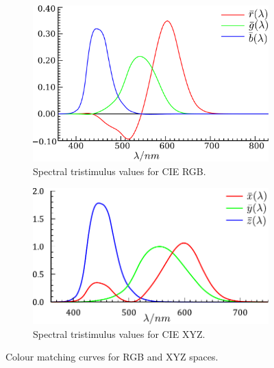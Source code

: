 \begin{figure}[htpb!]
        \centering
        \begin{subfigure}[b]{0.7\textwidth}
                \includegraphics[width=\textwidth]{img/CIE_RGB}
                \caption{Spectral tristimulus values for CIE RGB\footnotemark.}
                \label{fig:cie_rgb}
        \end{subfigure}%
        \quad %
        \begin{subfigure}[b]{0.7\textwidth}
                \includegraphics[width=\textwidth]{img/CIE_XYZ}
                \caption{Spectral tristimulus values for CIE XYZ\footnotemark.}
                \label{fig:cie_xyz}
        \end{subfigure}
        \begin{minipage}{\linewidth}
        		\renewcommand{\thempfootnote}{\arabic{mpfootnote}} %
	        		\caption{Colour matching curves for RGB and XYZ spaces.}
        	\end{minipage}
\end{figure} 

